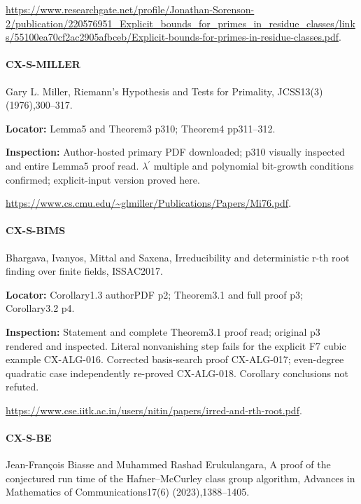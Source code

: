 \documentclass[11pt,a4paper]{article}
\begin{document}
\url{https://www.researchgate.net/profile/Jonathan-Sorenson-2/publication/220576951_Explicit_bounds_for_primes_in_residue_classes/links/55100ea70cf2ac2905afbceb/Explicit-bounds-for-primes-in-residue-classes.pdf}.

\paragraph{CX-S-MILLER} Gary L.\allowbreak{} Miller, Riemann’s Hypothesis and Tests for Primality, JCSS13(3) (1976),300–\allowbreak{}317.

\textbf{Locator:} Lemma5 and Theorem3 p310; Theorem4 pp311–\allowbreak{}312.

\textbf{Inspection:} Author-hosted primary PDF downloaded; p310 visually inspected and entire Lemma5 proof read.\allowbreak{} \ensuremath{\lambda}\ensuremath{{}^{\prime}} multiple and polynomial bit-growth conditions confirmed; explicit-input version proved here.\allowbreak{}

\url{https://www.cs.cmu.edu/~glmiller/Publications/Papers/Mi76.pdf}.

\paragraph{CX-S-BIMS} Bhargava, Ivanyos, Mittal and Saxena, Irreducibility and deterministic r-th root finding over finite fields, ISSAC2017.

\textbf{Locator:} Corollary1.\allowbreak{}3 authorPDF p2; Theorem3.\allowbreak{}1 and full proof p3; Corollary3.\allowbreak{}2 p4.

\textbf{Inspection:} Statement and complete Theorem3.\allowbreak{}1 proof read; original p3 rendered and inspected.\allowbreak{} Literal nonvanishing step fails for the explicit F7 cubic example CX-ALG-016.\allowbreak{} Corrected basis-search proof CX-ALG-017; even-degree quadratic case independently re-proved CX-ALG-018.\allowbreak{} Corollary conclusions not refuted.\allowbreak{}

\url{https://www.cse.iitk.ac.in/users/nitin/papers/irred-and-rth-root.pdf}.

\paragraph{CX-S-BE} Jean-François Biasse and Muhammed Rashad Erukulangara, A proof of the conjectured run time of the Hafner–\allowbreak{}McCurley class group algorithm, Advances in Mathematics of Communications17(6) (2023),1388–\allowbreak{}1405.
\end{document}
